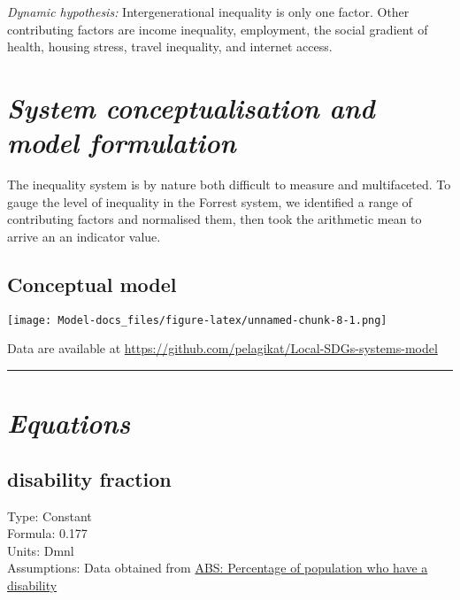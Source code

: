\documentclass[
  11pt,
]{book}
\begin{document}
\emph{Dynamic hypothesis:}
Intergenerational inequality is only one factor. Other contributing factors are income inequality, employment, the social gradient of health, housing stress, travel inequality, and internet access.

\hypertarget{system-conceptualisation-and-model-formulation-2}{%
\section{\texorpdfstring{\emph{System conceptualisation and model formulation}}{System conceptualisation and model formulation}}\label{system-conceptualisation-and-model-formulation-2}}

The inequality system is by nature both difficult to measure and multifaceted. To gauge the level of inequality in the Forrest system, we identified a range of contributing factors and normalised them, then took the arithmetic mean to arrive an an indicator value.

\hypertarget{conceptual-model-5}{%
\subsection{Conceptual model}\label{conceptual-model-5}}

\texttt{[image: Model-docs\_files/figure-latex/unnamed-chunk-8-1.png]}

Data are available at \url{https://github.com/pelagikat/Local-SDGs-systems-model}

\begin{center}\rule{0.5\linewidth}{0.5pt}\end{center}

\hypertarget{equations-7}{%
\section{\texorpdfstring{\emph{Equations}}{Equations}}\label{equations-7}}

\hypertarget{disability-fraction}{%
\subsection{disability fraction}\label{disability-fraction}}

Type: Constant\\
Formula: 0.177\\
Units: Dmnl\\
Assumptions: Data obtained from \href{https://www.abs.gov.au/statistics/health/disability/disability-ageing-and-carers-australia-summary-findings/2018}{ABS: Percentage of population who have a disability}
\end{document}
